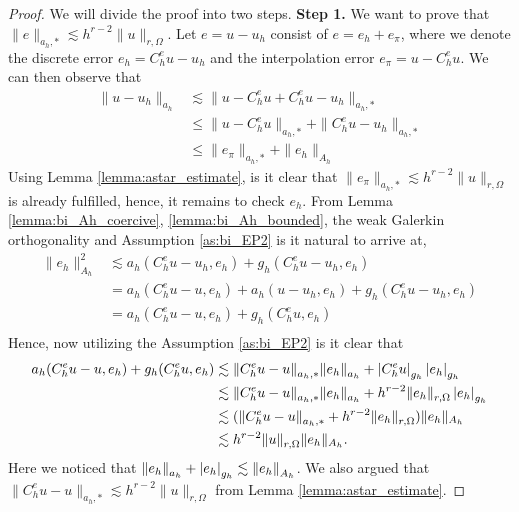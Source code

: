 \begin{proof}
    We will divide the proof into two steps.
        \textbf{Step 1.} We want to prove that $\| e \|_{ a_{h},* }^{  } \lesssim   h^{r-2} \| u \|_{ r,\Omega  }^{  }$.
    Let $e = u - u_{h}$ consist of $e = e_{h} + e_{\pi }$, where we denote the discrete error $e_{h} = C _{h}^{e} u - u_{h}$ and the interpolation error $e_{\pi } = u - C _{h} ^{e}u$. We can then observe that
    \[
        \begin{split}
    \| u - u_{h} \|_{ a_{h} }^{  } & \lesssim  \| u - C_{h}^{e} u + C_{h}^{e}u - u_{h} \|_{ a_{h},* }^{  } \\
    & \le \|  u - C_{h}^{e} u \|_{a_{h},*  }^{  } +  \| C_{h}^{e}u - u_{h} \|_{a_{h},*  }^{  }\\
                                     & \le \| e_{\pi } \|_{a_{h},*}^{  } + \| e_{h} \|_{A_{h}  }^{  }
        \end{split}
    \]
    Using Lemma \ref{lemma:astar_estimate}, is it clear that $\| e_{\pi } \|_{a_{h},*}^{  } \lesssim h^{r-2} \| u \|_{ r,\Omega  }^{  }  $ is already fulfilled, hence, it remains to check $e_{h}$. From Lemma \ref{lemma:bi_Ah_coercive},
    \ref{lemma:bi_Ah_bounded}, the weak Galerkin orthogonality and Assumption \ref{as:bi_EP2} is it natural to arrive at,
    \begin{equation}
        \label{eq:apriori_energy1}
    \begin{split}
\| e_{h} \|_{ A_{h} }^{ 2 } & \lesssim a_{h}( C _{h}^{e} u - u_{h}, e_{h}) + g_{h}( C _{h}^{e}u - u_{h}, e_{h}) \\
 & = a_{h}( C _{h}^{e} u - u, e_{h}) + a_{h}( u - u_{h}, e_{h}) + g_{h}( C _{h}^{e}u - u_{h}, e_{h}) \\
 & = a_{h}( C _{h}^{e} u - u, e_{h}) + g_{h}( C _{h}^{e}u, e_{h}) \\
    \end{split}
    \end{equation}
Hence, now utilizing the Assumption \ref{as:bi_EP2} is it clear that
\begin{equation}
        \label{eq:apriori_energy2}
    \begin{split}
        a_{h}( C _{h}^{e} u - u, e_{h}) + g_{h}( C _{h}^{e}u, e_{h}) &\lesssim \| C _{h}^{e} u - u \|_{a_{h},*  }^{  } \| e_{h} \|_{a_{h}  }^{  }
        + \left\lvert  C _{h}^{e}u  \right\rvert_{g_{h}} \left\lvert e_{h}   \right\rvert_{g_{h}} \\
         &\lesssim \| C _{h}^{e} u - u \|_{a_{h},*  }^{  } \| e_{h} \|_{a_{h}  }^{  } + h^{r-2} \| e_{h} \|_{r, \Omega   }^{  }\left\lvert e_{h}   \right\rvert_{g_{h}} \\
         &\lesssim (\| C _{h}^{e} u - u \|_{a_{h},*  }^{  } + h^{r-2} \| e_{h} \|_{r, \Omega   }^{  }) \|e_{h}\|_{A_{h}} \\
         &\lesssim  h^{r-2} \| u \|_{r, \Omega   }^{  } \|e_{h}\|_{A_{h}}.
    \end{split}
\end{equation}
Here we noticed that $\| e_{h} \|_{a_{h}  }^{  } + \left\lvert e_{h}   \right\rvert_{g_{h}} \lesssim \| e_{h} \|_{ A_{h} }^{  }  $. We also argued that $\| C _{h}^{e} u - u \|_{a_{h},*  }^{  } \lesssim h^{r-2}\| u \|_{ r,\Omega  }^{  }  $ from Lemma
\ref{lemma:astar_estimate}.


\end{proof}
